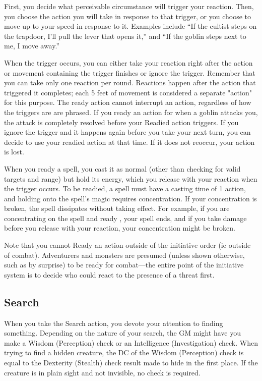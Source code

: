 First, you decide what perceivable circumstance will trigger your reaction. Then, you choose the action you will take in response to that trigger, or you choose to move up to your speed in response to it. Examples include “If the cultist steps on the trapdoor, I'll pull the lever that opens it,” and “If the goblin steps next to me, I move away.”

When the trigger occurs, you can either take your reaction right after the action or movement containing the trigger finishes or ignore the trigger. Remember that you can take only one reaction per round. Reactions happen after the action that triggered it completes; each 5 feet of movement is considered a separate "action" for this purpose. The ready action cannot interrupt an action, regardless of how the triggers are are phrased. If you ready an action for when a goblin attacks you, the attack is completely resolved before your Readied action triggers. If you ignore the trigger and it happens again before you take your next turn, you can decide to use your readied action at that time. If it does not reoccur, your action is lost.

When you ready a spell, you cast it as normal (other than checking for valid targets and range) but hold its energy, which you release with your reaction when the trigger occurs. To be readied, a spell must have a casting time of 1 action, and holding onto the spell's magic requires concentration. If your concentration is broken, the spell dissipates without taking effect. For example, if you are concentrating on the  spell and ready , your  spell ends, and if you take damage before you release  with your reaction, your concentration might be broken.

Note that you cannot Ready an action outside of the initiative order (ie outside of combat). Adventurers and monsters are presumed (unless shown otherwise, such as by surprise) to be ready for combat---the entire point of the initiative system is to decide who could react to the presence of a threat first.

\subsection{Search}

When you take the Search action, you devote your attention to finding something. Depending on the nature of your search, the GM might have you make a Wisdom (Perception) check or an Intelligence (Investigation) check. When trying to find a hidden creature, the DC of the Wisdom (Perception) check is equal to the Dexterity (Stealth) check result made to hide in the first place. If the creature is in plain sight and not invisible, no check is required.

